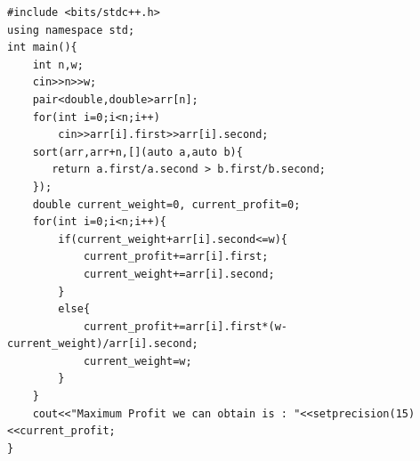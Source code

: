 \documentclass[10pt]{article}
\begin{document}
\begin{lstlisting}
#include <bits/stdc++.h>
using namespace std;
int main(){
    int n,w;
    cin>>n>>w;
    pair<double,double>arr[n];
    for(int i=0;i<n;i++)
        cin>>arr[i].first>>arr[i].second;
    sort(arr,arr+n,[](auto a,auto b){
       return a.first/a.second > b.first/b.second; 
    });
    double current_weight=0, current_profit=0;
    for(int i=0;i<n;i++){
        if(current_weight+arr[i].second<=w){
            current_profit+=arr[i].first;
            current_weight+=arr[i].second;
        }
        else{
            current_profit+=arr[i].first*(w-current_weight)/arr[i].second;
            current_weight=w;
        }
    }
    cout<<"Maximum Profit we can obtain is : "<<setprecision(15)<<current_profit;
}
\end{lstlisting}
\clearpage

	
\end{document}

